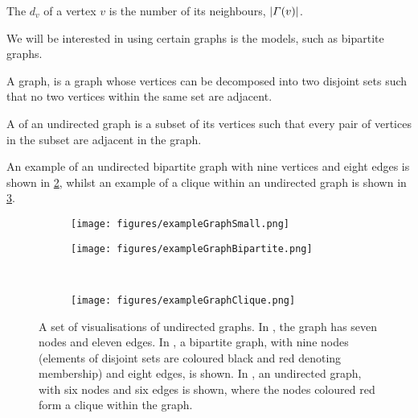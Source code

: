 \begin{definition}
	\label{def:degreeNode}
	The  $d_{v}$ of a vertex $v$ is the number of its neighbours, $\left\vert\Gamma(v)\right\vert$.
\end{definition}
We will be interested in using certain graphs is the models, such as bipartite graphs.
\begin{definition}
	\label{def:bipartiteGraph}
	A  graph, is a graph whose vertices can be decomposed into two disjoint sets such that no two vertices within the same set are adjacent.
\end{definition}
\begin{definition}
	\label{def:clique}
	A  of an undirected graph is a subset of its vertices such that every pair of vertices in the subset are adjacent in the graph.
\end{definition}
An example of an undirected bipartite graph with nine vertices and eight edges is shown in \cref{fig:exampleGraphBipartite}, whilst an example of a clique within an undirected graph is shown in \cref{fig:exampleGraphClique}.

\begin{figure}
\centering
	\begin{subfigure}{.5\textwidth}
		\centering
		\texttt{[image: figures/exampleGraphSmall.png]}
		\caption{}
		\label{fig:exampleGraphSmall}
	\end{subfigure}%
	\begin{subfigure}{.5\textwidth}
		\centering
		\texttt{[image: figures/exampleGraphBipartite.png]}
		\caption{}
		\label{fig:exampleGraphBipartite}
	\end{subfigure}\\
	\begin{subfigure}{.5\textwidth}
		\centering
		\texttt{[image: figures/exampleGraphClique.png]}
		\caption{}
		\label{fig:exampleGraphClique}
	\end{subfigure}
	\caption[Visualisations of example undirected graphs]{\label{fig:exampleGraphs} A set of visualisations of undirected graphs. In , the graph has seven nodes and eleven edges. In , a bipartite graph, with nine nodes (elements of disjoint sets are coloured black and red denoting membership) and eight edges, is shown. In , an undirected graph, with six nodes and six edges is shown, where the nodes coloured red form a clique within the graph.}
\end{figure}

